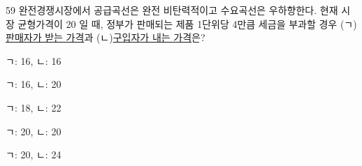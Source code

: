 \begin{question}{59}
완전경쟁시장에서 공급곡선은 완전 비탄력적이고 수요곡선은 우하향한다. 현재 시장 균형가격이 20 일 때, 정부가 판매되는 제품 1단위당 4만큼 세금을 부과할 경우 (ㄱ)\uline{판매자가 받는 가격}과 (ㄴ)\uline{구입자가 내는 가격}은?
\begin{choices}
  \item ㄱ: 16, ㄴ: 16
  \item ㄱ: 16, ㄴ: 20
  \item ㄱ: 18, ㄴ: 22
  \item ㄱ: 20, ㄴ: 20
  \item ㄱ: 20, ㄴ: 24
\end{choices}
\end{question}

